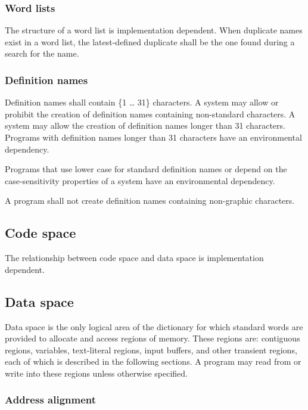 \subsubsection{Word lists} %

The structure of a word list is implementation dependent. When
duplicate names exist in a word list, the latest-defined duplicate
shall be the one found during a search for the name.

\subsubsection{Definition names} %
\label{usage:names}

Definition names shall contain \{1 {\ldots} 31\} characters.
A system may allow or prohibit the creation of definition names
containing non-standard characters.  A system may allow the creation
of definition names longer than 31 characters.  Programs with
definition names longer than 31 characters have an environmental
dependency.

Programs that use lower case for standard definition names or depend
on the case-sensitivity properties of a system have an environmental
dependency.

A program shall not create definition names containing non-graphic
characters.

\subsection{Code space} %

The relationship between code space and data space is implementation
dependent.

\subsection{Data space} %
\label{usage:dataspace}

Data space is the only logical area of the dictionary for which
standard words are provided to allocate and access regions of
memory. These regions are: contiguous regions, variables,
text-literal regions, input buffers, and other transient regions,
each of which is described in the following sections. A program may
read from or write into these regions unless otherwise specified.

\subsubsection{Address alignment} %
\label{usage:aaddr}

